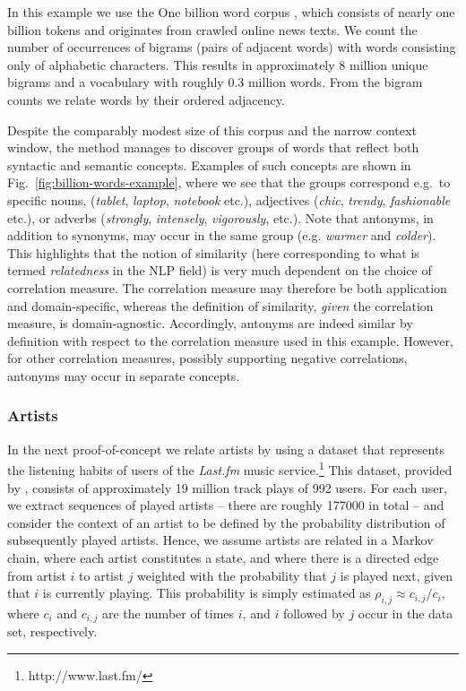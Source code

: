 \documentclass{kais}
\newcommand{\rn}[1]{\rho_{#1}}
\begin{document}
In this example we use the One billion word corpus \cite{Chelba13}, which consists of
nearly one billion tokens and originates from crawled online news texts. We count the number 
of occurrences of bigrams (pairs of adjacent words) with words consisting only
of alphabetic characters. This results in approximately 8 million unique
bigrams and a vocabulary with roughly 0.3 million words. From the bigram counts
we relate words by their ordered adjacency.

Despite the comparably modest size of this corpus and the narrow context window, the method
manages to discover groups of words that reflect both syntactic and semantic
concepts. Examples of such concepts are shown in Fig.\ \ref{fig:billion-words-example},
where we see that the groups correspond e.g.\ to specific nouns,
 (\emph{tablet}, \emph{laptop}, \emph{notebook} etc.), adjectives
 (\emph{chic}, \emph{trendy}, \emph{fashionable} etc.), or adverbs
 (\emph{strongly}, \emph{intensely}, \emph{vigorously}, etc.). Note that antonyms, in addition to synonyms, 
 may occur in the same group (e.g. \emph{warmer} and \emph{colder}). This highlights that the notion of similarity (here
 corresponding to what is termed \emph{relatedness} in the NLP field)
 is very much dependent on the choice of correlation measure. The correlation measure may therefore be both
 application and domain-specific, whereas the definition of similarity, \emph{given} the correlation measure, is domain-agnostic. 
 Accordingly, antonyms are indeed similar by definition with respect to the correlation measure used in this example. However, 
 for other correlation measures, possibly supporting negative correlations, antonyms may occur in separate concepts.

\subsubsection{Artists}
In the next proof-of-concept we relate artists by using a dataset that represents the listening
habits of users of the \emph{Last.fm} music service.\footnote{http://www.last.fm/} This dataset, provided by
, consists of approximately 19 million track plays of 992 users. For each user, we extract sequences of
played artists -- there are roughly 177000 in total -- and consider the context of an artist to be defined by the probability
distribution of subsequently played artists. Hence, we assume artists are related in a Markov chain, where each artist
constitutes a state, and where there is a directed edge from artist $i$ to artist $j$ weighted with the probability
that $j$ is played next, given that $i$ is currently playing. This probability is simply estimated as $\rn{i,j} \approx
c_{i,j}/c_i$, where $c_i$ and $c_{i,j}$ are the number of times $i$, and $i$ followed by $j$ occur in the data set,
respectively.
\end{document}
